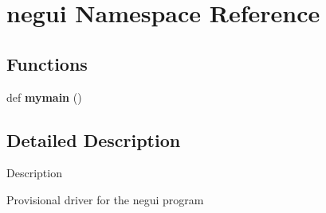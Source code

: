 \hypertarget{namespacenegui}{}\section{negui Namespace Reference}
\label{namespacenegui}
\subsection*{Functions}
\begin{DoxyCompactItemize}
\item 
def {\bfseries mymain} ()\hypertarget{namespacenegui_aa0602299718c5127673ef7aed0b21dec}{}\label{namespacenegui_aa0602299718c5127673ef7aed0b21dec}

\end{DoxyCompactItemize}


\subsection{Detailed Description}
\begin{DoxyVerb}Description

Provisional driver for the negui program
\end{DoxyVerb}
 